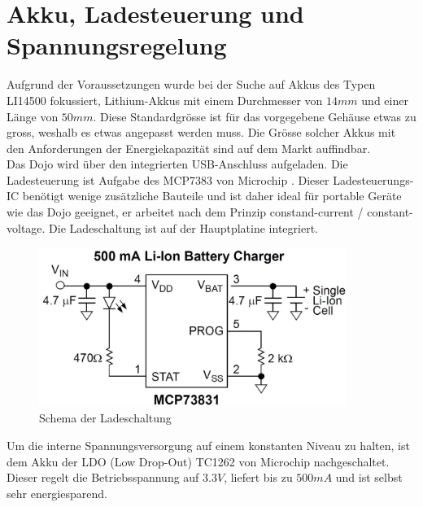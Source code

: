\section{Akku, Ladesteuerung und Spannungsregelung}

Aufgrund der Voraussetzungen wurde bei der Suche auf Akkus des Typen LI14500 fokussiert, Lithium-Akkus mit einem Durchmesser von $14mm$ und einer Länge von $50mm$. Diese Standardgrösse ist für das vorgegebene Gehäuse etwas zu gross, weshalb es etwas angepasst werden muss. Die Grösse solcher Akkus mit den Anforderungen der Energiekapazität sind auf dem Markt auffindbar.\\

Das Dojo wird über den integrierten USB-Anschluss aufgeladen. Die Ladesteuerung ist Aufgabe des MCP7383 von Microchip . Dieser Ladesteuerungs-IC benötigt wenige zusätzliche Bauteile und ist daher ideal für portable Geräte wie das Dojo geeignet, er arbeitet nach dem Prinzip constand-current / constant-voltage. Die Ladeschaltung ist auf der Hauptplatine integriert.\\

\begin{figure}[htp]
	\centering
	\includegraphics[width=10cm]{Bilder/LadeschaltungSchema.JPG}
	 \caption{Schema der Ladeschaltung}
	 \label{fig:Ladeschaltung}
\end{figure}

Um die interne Spannungsversorgung auf einem konstanten Niveau zu halten, ist dem Akku der LDO (Low Drop-Out) TC1262 von Microchip nachgeschaltet. Dieser regelt die Betriebsspannung auf $3.3V$, liefert bis zu $500mA$ und ist selbst sehr energiesparend.



